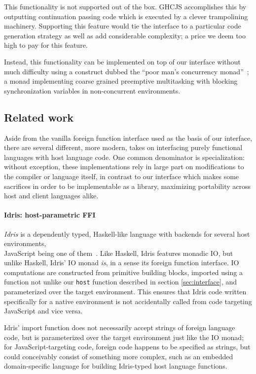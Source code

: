\documentclass[preprint]{sigplanconf}
\begin{document}
This functionality is not supported out of the box. GHCJS accomplishes this
by outputting continuation passing code which is executed by a clever
trampolining machinery. Supporting this feature would tie the interface to
a particular code generation strategy as well as add considerable complexity;
a price we deem too high to pay for this feature.

Instead, this functionality can be implemented on top of our interface without
much difficulty using a construct dubbed the ``poor man's concurrency
monad''\ \cite{poormansconcurrencymonad}; a monad implementing coarse grained
preemptive multitasking with blocking synchronization variables in
non-concurrent environments.

\subsection{Related work}\label{sec:related}
Aside from the vanilla foreign function interface used as the basis of our
interface, there are several different, more modern, takes on interfacing
purely functional languages with host language code.
One common denominator is specialization: without exception, these
implementations rely in large part on modifications to the compiler or
language itself, in contrast to our interface which makes some sacrifices
in order to be implementable as a library, maximizing portability across
host and client languages alike.

\paragraph{Idris: host-parametric FFI}
\emph{Idris} is a dependently typed, Haskell-like language with backends for
several host environments,\\
JavaScript being one of them\ \cite{idris}.
Like Haskell, Idris features monadic IO, but unlike Haskell, Idris' IO monad
\emph{is}, in a sense its foreign function interface.
IO computations are constructed from primitive building blocks, imported using
a function not unlike our \lstinline!host! function described in section
\ref{sec:interface}, and parameterized over the target environment.
This ensures that Idris code written specifically for a native environment
is not accidentally called from code targeting JavaScript and vice versa.

Idris' import function does not necessarily accept strings of foreign
language code, but is parameterized over the target environment just like the
IO monad; for JavaScript-targeting code, foreign code happens to be specified
as strings, but could conceivably consist of something more complex, such as
an embedded domain-specific language for building Idris-typed host language
functions.
\end{document}
